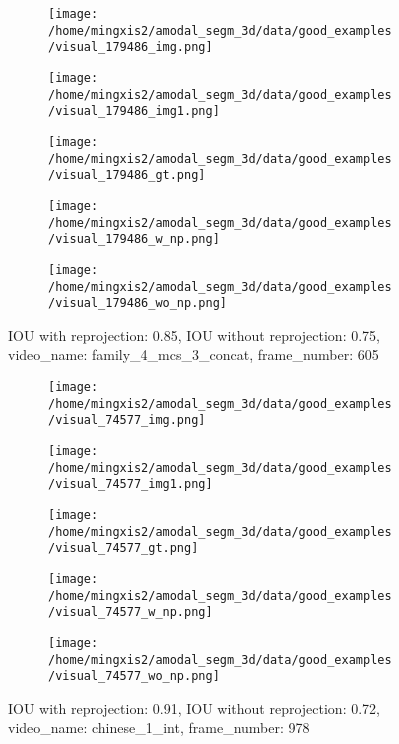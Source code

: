 \begin{figure}
\centering
\begin{subfigure}[t]{0.19\textwidth}
\centering
\texttt{[image: /home/mingxis2/amodal\_segm\_3d/data/good\_examples/visual\_179486\_img.png]}
\end{subfigure}
\begin{subfigure}[t]{0.19\textwidth}
\centering
\texttt{[image: /home/mingxis2/amodal\_segm\_3d/data/good\_examples/visual\_179486\_img1.png]}
\end{subfigure}
\begin{subfigure}[t]{0.19\textwidth}
\centering
\texttt{[image: /home/mingxis2/amodal\_segm\_3d/data/good\_examples/visual\_179486\_gt.png]}
\end{subfigure}
\begin{subfigure}[t]{0.19\textwidth}
\centering
\texttt{[image: /home/mingxis2/amodal\_segm\_3d/data/good\_examples/visual\_179486\_w\_np.png]}
\end{subfigure}
\begin{subfigure}[t]{0.19\textwidth}
\centering
\texttt{[image: /home/mingxis2/amodal\_segm\_3d/data/good\_examples/visual\_179486\_wo\_np.png]}
\end{subfigure}
\caption{IOU with reprojection: 0.85, IOU without reprojection: 0.75, video\_name: family\_4\_mcs\_3\_concat, frame\_number: 605}
\label{fig:reproj_mask}
\end{figure}

\begin{figure}
\centering
\begin{subfigure}[t]{0.19\textwidth}
\centering
\texttt{[image: /home/mingxis2/amodal\_segm\_3d/data/good\_examples/visual\_74577\_img.png]}
\end{subfigure}
\begin{subfigure}[t]{0.19\textwidth}
\centering
\texttt{[image: /home/mingxis2/amodal\_segm\_3d/data/good\_examples/visual\_74577\_img1.png]}
\end{subfigure}
\begin{subfigure}[t]{0.19\textwidth}
\centering
\texttt{[image: /home/mingxis2/amodal\_segm\_3d/data/good\_examples/visual\_74577\_gt.png]}
\end{subfigure}
\begin{subfigure}[t]{0.19\textwidth}
\centering
\texttt{[image: /home/mingxis2/amodal\_segm\_3d/data/good\_examples/visual\_74577\_w\_np.png]}
\end{subfigure}
\begin{subfigure}[t]{0.19\textwidth}
\centering
\texttt{[image: /home/mingxis2/amodal\_segm\_3d/data/good\_examples/visual\_74577\_wo\_np.png]}
\end{subfigure}
\caption{IOU with reprojection: 0.91, IOU without reprojection: 0.72, video\_name: chinese\_1\_int, frame\_number: 978}
\end{figure}

